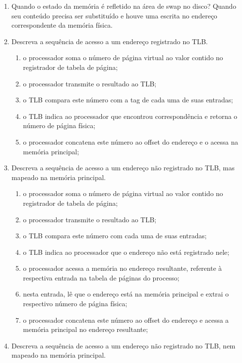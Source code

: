 \documentclass{article}
\begin{document}
\begin{enumerate}
\item Quando o estado da memória é refletido na área de swap no disco? Quando seu conteúdo precisa ser substituído e houve uma escrita no endereço correspondente da memória física.

\item Descreva a sequência de acesso a um endereço registrado no TLB.

\begin{enumerate}
    \item o processador soma o número de página virtual ao valor contido no registrador de tabela de página;
    \item o processador transmite o resultado ao TLB;
    \item o TLB compara este número com a tag de cada uma de suas entradas;
    \item o TLB indica ao processador que encontrou correspondência e retorna o número de página física;
    \item o processador concatena este número ao offset do endereço e o acessa na memória principal;
\end{enumerate}

\item Descreva a sequência de acesso a um endereço não registrado no TLB, mas mapeado na memória principal.

\begin{enumerate}
    \item o processador soma o número de página virtual ao valor contido no registrador de tabela de página;
    \item o processador transmite o resultado ao TLB;
    \item o TLB compara este número com cada uma de suas entradas;
    \item o TLB indica ao processador que o endereço não está registrado nele;
    \item o processador acessa a memória no endereço resultante, referente à respectiva entrada na tabela de páginas do processo;
    \item nesta entrada, lê que o endereço está na memória principal e extrai o respectivo número de página física;
    \item o processador concatena este número ao offset do endereço e acessa a memória principal no endereço resultante;
\end{enumerate}

\item Descreva a sequência de acesso a um endereço não registrado no TLB, nem mapeado na memória principal.


\end{enumerate}
\end{document}
